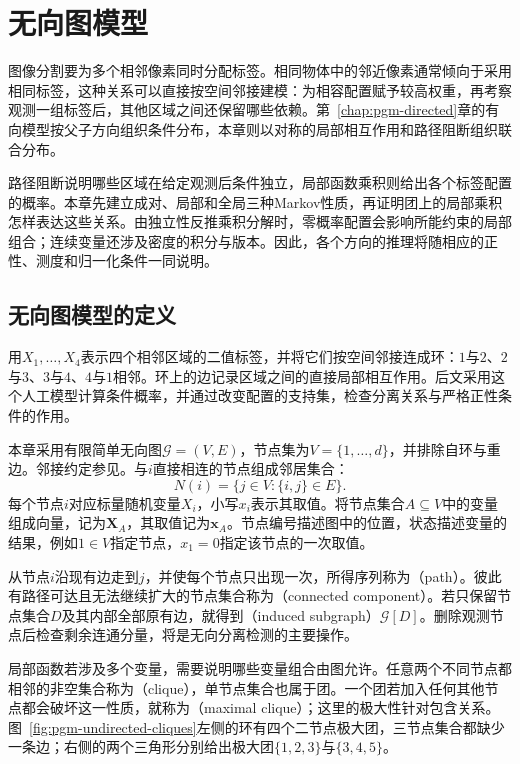 \chapter{无向图模型}
\label{chap:pgm-undirected}

图像分割要为多个相邻像素同时分配标签。相同物体中的邻近像素通常倾向于采用相同标签，这种关系可以直接按空间邻接建模：为相容配置赋予较高权重，再考察观测一组标签后，其他区域之间还保留哪些依赖。第~\ref{chap:pgm-directed}章的有向模型按父子方向组织条件分布，本章则以对称的局部相互作用和路径阻断组织联合分布。

路径阻断说明哪些区域在给定观测后条件独立，局部函数乘积则给出各个标签配置的概率。本章先建立成对、局部和全局三种Markov性质，再证明团上的局部乘积怎样表达这些关系。由独立性反推乘积分解时，零概率配置会影响所能约束的局部组合；连续变量还涉及密度的积分与版本。因此，各个方向的推理将随相应的正性、测度和归一化条件一同说明。

\section{无向图模型的定义}
\label{sec:pgm-undirected-definition}

用$X_1,\ldots,X_4$表示四个相邻区域的二值标签，并将它们按空间邻接连成环：$1$与$2$、$2$与$3$、$3$与$4$、$4$与$1$相邻。环上的边记录区域之间的直接局部相互作用。后文采用这个人工模型计算条件概率，并通过改变配置的支持集，检查分离关系与严格正性条件的作用。

本章采用有限简单无向图$\mathcal G=(V,E)$，节点集为$V=\{1,\ldots,d\}$，并排除自环与重边。邻接约定参见。与$i$直接相连的节点组成邻居集合：
\[
  N(i)=\{j\in V:\{i,j\}\in E\}.
\]
每个节点$i$对应标量随机变量$X_i$，小写$x_i$表示其取值。将节点集合$A\subseteq V$中的变量组成向量，记为$\bm{X}_A$，其取值记为$\bm{x}_A$。节点编号描述图中的位置，状态描述变量的结果，例如$1\in V$指定节点，$x_1=0$指定该节点的一次取值。

从节点$i$沿现有边走到$j$，并使每个节点只出现一次，所得序列称为（path）。彼此有路径可达且无法继续扩大的节点集合称为（connected component）。若只保留节点集合$D$及其内部全部原有边，就得到（induced subgraph）$\mathcal{G}[D]$。删除观测节点后检查剩余连通分量，将是无向分离检测的主要操作。

局部函数若涉及多个变量，需要说明哪些变量组合由图允许。任意两个不同节点都相邻的非空集合称为（clique），单节点集合也属于团。一个团若加入任何其他节点都会破坏这一性质，就称为（maximal clique）；这里的极大性针对包含关系。图~\ref{fig:pgm-undirected-cliques}左侧的环有四个二节点极大团，三节点集合都缺少一条边；右侧的两个三角形分别给出极大团$\{1,2,3\}$与$\{3,4,5\}$。


